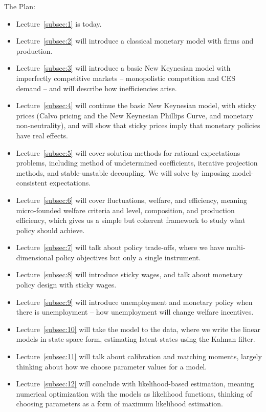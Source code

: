 \documentclass[10pt]{article}
\begin{document}
The Plan:
\begin{itemize}
	\item Lecture~\ref{subsec:1} is today.
	\item Lecture~\ref{subsec:2} will introduce a classical monetary model with firms and production. 
	\item Lecture~\ref{subsec:3} will introduce a basic New Keynesian model with imperfectly competitive markets -- monopolistic competition and CES demand -- and will describe how inefficiencies arise. 
	\item Lecture~\ref{subsec:4} will continue the basic New Keynesian model, with sticky prices (Calvo pricing and the New Keynesian Phillips Curve, and monetary non-neutrality), and will show that sticky prices imply that monetary policies have real effects. 
	\item Lecture~\ref{subsec:5} will cover solution methods for rational expectations problems, including method of undetermined coefficients, iterative projection methods, and stable-unstable decoupling. We will solve by imposing model-consistent expectations.
	\item Lecture~\ref{subsec:6} will cover fluctuations, welfare, and efficiency, meaning micro-founded welfare criteria and level, composition, and production efficiency, which gives us a simple but coherent framework to study what policy should achieve.
	\item Lecture~\ref{subsec:7} will talk about policy trade-offs, where we have multi-dimensional policy objectives but only a single instrument.
	\item Lecture~\ref{subsec:8} will introduce sticky wages, and talk about monetary policy design with sticky wages.
	\item Lecture~\ref{subsec:9} will introduce unemployment and monetary policy when there is unemployment -- how unemployment will change welfare incentives.
	\item Lecture~\ref{subsec:10} will take the model to the data, where we write the linear models in state space form, estimating latent states using the Kalman filter.
	\item Lecture~\ref{subsec:11} will talk about calibration and matching moments, largely thinking about how we choose parameter values for a model.
	\item Lecture~\ref{subsec:12} will conclude with likelihood-based estimation, meaning numerical optimization with the models as likelihood functions, thinking of choosing parameters as a form of maximum likelihood estimation.
\end{itemize}
\end{document}
